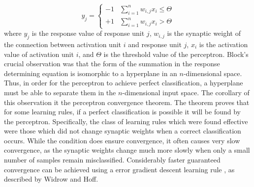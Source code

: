 \documentclass[11pt]{afthesis}
\begin{document}
	\begin{equation} 
	y_j = \begin{cases}
	-1 &\sum_{i=1}^{n} w_{i,j}x_{i} \leq \Theta\\
	+1 &\sum_{i=1}^{n} w_{i,j}x_{i} > \Theta
	\end{cases}
	\end{equation} where \begin{math} y_j \end{math} is the response value of response unit \begin{math} j \end{math}, \begin{math} w_{i,j} \end{math} is the synaptic weight of the connection between activation unit \begin{math} i \end{math} and response unit \begin{math} j \end{math}, \begin{math} x_{i} \end{math} is the activation value of activation unit \begin{math} i \end{math}, and \begin{math} \Theta \end{math} is the threshold value of the perceptron. Block's crucial observation was that the form of the summation in the response determining equation is isomorphic to a hyperplane in an \begin{math}n\end{math}-dimensional space. Thus, in order for the perceptron to achieve perfect classification, a hyperplane must be able to separate them in the \begin{math}n\end{math}-dimensional input space. The corollary of this observation it the perceptron convergence theorem. The theorem proves that for some learning rules, if a perfect classification is possible it will be found by the perceptron. Specifically, the class of learning rules which were found effective were those which did not change synaptic weights when a correct classification occurs. While the condition does ensure convergence, it often causes very slow convergence, as the synaptic weights change much more slowly when only a small number of samples remain misclassified. Considerably faster guaranteed convergence can be achieved using a error gradient descent learning rule \cite{widrow1960asc}, as described by Widrow and Hoff. 
	
\end{document}
